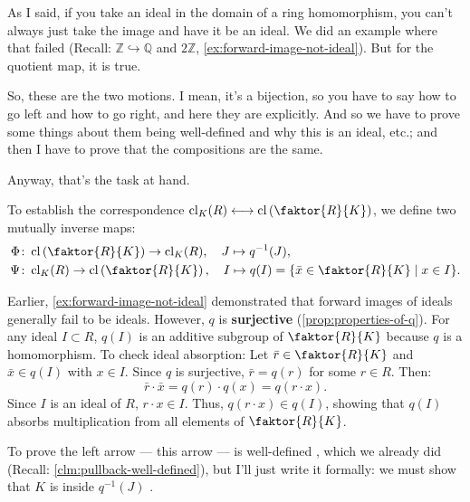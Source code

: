 \begin{proofWrapper}
\begin{speech}[00:22:05 - 00:23:35]
As I said, if you take an ideal in the domain of a ring homomorphism, you can't always just take the image and have it be an ideal. We did an example where that failed (Recall: $\mathbb{Z} \hookrightarrow \mathbb{Q}$ and $2\mathbb{Z}$, \cref{ex:forward-image-not-ideal}). But for the quotient map, it is true.

So, these are the two motions. I mean, it's a bijection, so you have to say how to go left and how to go right, and here they are explicitly. And so we have to prove some things about them being well-defined and why this is an ideal, etc.; and then I have to prove that the compositions are the same.

Anyway, that's the task at hand.
\end{speech}

\begin{content}
To establish the correspondence $\operatorname{cl}_K(R) \longleftrightarrow \operatorname{cl}\left(\faktor{R}{K}\right)$, we define two mutually inverse maps:
\begin{align}
\Phi &\colon \operatorname{cl}\left(\faktor{R}{K}\right) \to \operatorname{cl}_K(R), \quad J \mapsto q^{-1}(J), \label{eq:map-phi} \\
\Psi &\colon \operatorname{cl}_K(R) \to \operatorname{cl}\left(\faktor{R}{K}\right), \quad I \mapsto q(I) = \{ \bar{x} \in \faktor{R}{K} \mid x \in I \}. \label{eq:map-psi}
\end{align}

\begin{steps}
Earlier, \cref{ex:forward-image-not-ideal} demonstrated that forward images of ideals generally fail to be ideals. However, $q$ is \textbf{surjective} (\cref{prop:properties-of-q}).
For any ideal $I \subset R$, $q(I)$ is an additive subgroup of $\faktor{R}{K}$ because $q$ is a homomorphism. To check ideal absorption:
Let $\bar{r} \in \faktor{R}{K}$ and $\bar{x} \in q(I)$ with $x \in I$. Since $q$ is surjective, $\bar{r} = q(r)$ for some $r \in R$. Then:
\[
\bar{r} \cdot \bar{x} = q(r) \cdot q(x) = q(r \cdot x).
\]
Since $I$ is an ideal of $R$, $r \cdot x \in I$. Thus, $q(r \cdot x) \in q(I)$, showing that $q(I)$ absorbs multiplication from all elements of $\faktor{R}{K}$.
\end{steps}
\end{content}

\begin{speech}[00:23:35 - 00:25:06]
To prove the left arrow --- this arrow  --- is well-defined , which we already did (Recall: \cref{clm:pullback-well-defined}), but I'll just write it formally: we must show that $K$ is inside $q^{-1}(J)$ .


\end{speech}
\end{proofWrapper}
